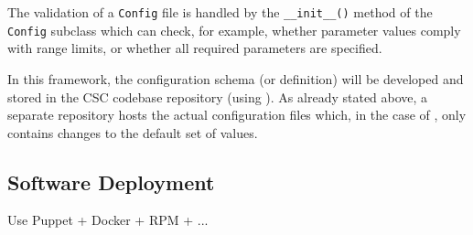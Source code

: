 The validation of a \texttt{Config} file is handled by the \texttt{\_\_init\_\_()} method of the \texttt{Config} subclass which can check, for example, whether parameter values comply with range limits, or whether all required parameters are specified.

In this framework, the configuration schema (or definition) will be developed and stored in the CSC codebase repository (using \pexC). As already stated above, a separate repository hosts the actual configuration files which, in the case of \pexC, only contains changes to the default set of values.



%


\subsection{Software Deployment}\label{sect:deploy}

Use Puppet + Docker +  RPM + ...














